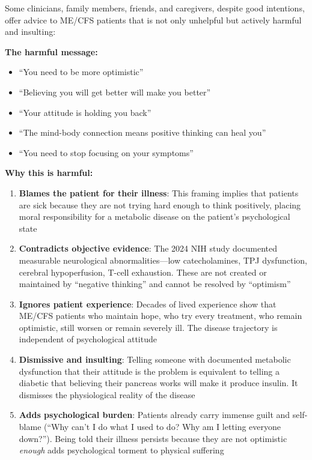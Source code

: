 \begin{warning}
Some clinicians, family members, friends, and caregivers, despite good intentions, offer advice to ME/CFS patients that is not only unhelpful but actively harmful and insulting:

\textbf{The harmful message:}
\begin{itemize}
    \item ``You need to be more optimistic''
    \item ``Believing you will get better will make you better''
    \item ``Your attitude is holding you back''
    \item ``The mind-body connection means positive thinking can heal you''
    \item ``You need to stop focusing on your symptoms''
\end{itemize}

\textbf{Why this is harmful:}

\begin{enumerate}
    \item \textbf{Blames the patient for their illness}: This framing implies that patients are sick because they are not trying hard enough to think positively, placing moral responsibility for a metabolic disease on the patient's psychological state

    \item \textbf{Contradicts objective evidence}: The 2024 NIH study documented measurable neurological abnormalities---low catecholamines, TPJ dysfunction, cerebral hypoperfusion, T-cell exhaustion. These are not created or maintained by ``negative thinking'' and cannot be resolved by ``optimism''

    \item \textbf{Ignores patient experience}: Decades of lived experience show that ME/CFS patients who maintain hope, who try every treatment, who remain optimistic, still worsen or remain severely ill. The disease trajectory is independent of psychological attitude

    \item \textbf{Dismissive and insulting}: Telling someone with documented metabolic dysfunction that their attitude is the problem is equivalent to telling a diabetic that believing their pancreas works will make it produce insulin. It dismisses the physiological reality of the disease

    \item \textbf{Adds psychological burden}: Patients already carry immense guilt and self-blame (``Why can't I do what I used to do? Why am I letting everyone down?''). Being told their illness persists because they are not optimistic \textit{enough} adds psychological torment to physical suffering


\end{enumerate}
\end{warning}
